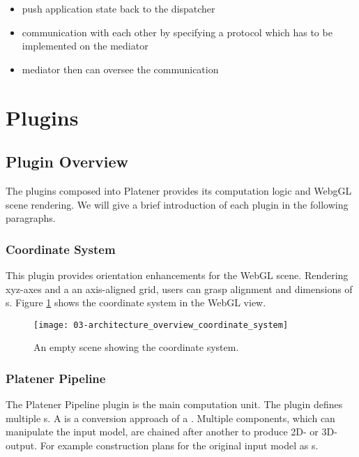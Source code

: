 \documentclass[../ClassicThesis.tex]{subfiles}
\begin{document}
\begin{itemize}
\item push application state back to the dispatcher
\item communication with each other by specifying a protocol which has to be
  implemented on the mediator
\item mediator then can oversee the communication
\end{itemize}

\section{Plugins}

\subsection{Plugin Overview}


The plugins composed into Platener provides its computation logic and WebgGL
scene rendering. We will give a brief introduction of each plugin in the
following paragraphs.

\subsubsection{Coordinate System}

This plugin provides orientation enhancements for the WebGL scene. Rendering
xyz-axes and a an axis-aligned grid, users can grasp alignment and dimensions of
{\threedmodel}s. Figure \ref{fig:architecture_overview_coordinate_system} shows
the coordinate system in the WebGL view.

\begin{figure}
  \label{fig:architecture_overview_coordinate_system}
  \texttt{[image: 03-architecture\_overview\_coordinate\_system]}
  \caption{An empty scene showing the coordinate system.}
\end{figure}

\subsubsection{Platener Pipeline}

The Platener Pipeline plugin is the main computation unit. The plugin defines
multiple {\fabmethod}s. A {\fabmethod} is a conversion approach of a
\threedmodel. Multiple components, which can manipulate the input model, are
chained after another to produce 2D- or 3D-output. For example construction
plans for the original input model as {\svgfile}s.
\end{document}
